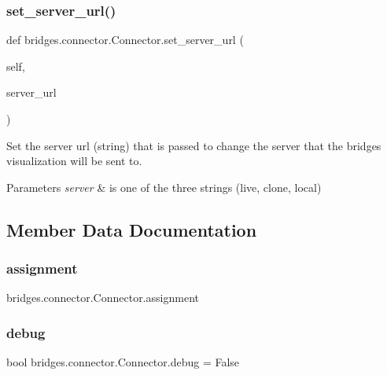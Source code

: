 \subsubsection{\texorpdfstring{set\+\_\+server\+\_\+url()}{set\_server\_url()}}
{\footnotesize\ttfamily def bridges.\+connector.\+Connector.\+set\+\_\+server\+\_\+url (\begin{DoxyParamCaption}\item[{}]{self,  }\item[{}]{server\+\_\+url }\end{DoxyParamCaption})}



Set the server url (string) that is passed to change the server that the bridges visualization will be sent to. 


\begin{DoxyParams}{Parameters}
{\em server} & is one of the three strings (\textquotesingle{}live\textquotesingle{}, \textquotesingle{}clone\textquotesingle{}, \textquotesingle{}local\textquotesingle{}) \\
\hline
\end{DoxyParams}


\subsection{Member Data Documentation}
\mbox{\label{classbridges_1_1connector_1_1_connector_a2df020c062b6224d4eeb2c5407c02656}} 
\subsubsection{\texorpdfstring{assignment}{assignment}}
{\footnotesize\ttfamily bridges.\+connector.\+Connector.\+assignment}

\mbox{\label{classbridges_1_1connector_1_1_connector_a05ea0150f79561e26b725654fe8ff7dc}} 
\subsubsection{\texorpdfstring{debug}{debug}}
{\footnotesize\ttfamily bool bridges.\+connector.\+Connector.\+debug = False\hspace{0.3cm}{\ttfamily [static]}}

